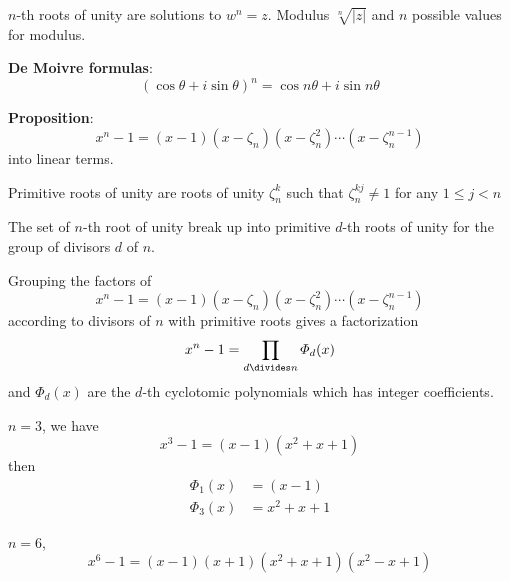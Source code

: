 \documentclass{report}
\begin{document}
$n$-th roots of unity are solutions to $w^{n} = z$. Modulus $\sqrt[n]{\lvert z \rvert}$ and $n$ possible values for modulus.

\textbf{De Moivre formulas}: 
    \begin{equation*}
        (\cos{\theta} + i \sin{\theta})^{n} = \cos{n \theta} + i \sin{n \theta}
    \end{equation*}

\textbf{Proposition}:
    \begin{equation*}
        x^{n} - 1 = (x - 1)(x - \zeta_{n})(x - \zeta_{n}^{2}) \cdots (x - \zeta_{n}^{n - 1})
    \end{equation*} 
into linear terms.

Primitive roots of unity are roots of unity $\zeta_{n}^{k}$ such that $\zeta_{n}^{kj} \neq 1$ for any $1 \leq j < n$

\begin{theorem}{}
    The set of $n$-th root of unity break up into primitive $d$-th roots of unity for the group of divisors $d$ of $n$.
\end{theorem}

\begin{theorem}{}
    Grouping the factors of 
        \begin{equation*}
            x^{n} - 1 = (x - 1)(x - \zeta_{n})(x - \zeta_{n}^{2}) \cdots (x - \zeta_{n}^{n - 1})
        \end{equation*}
    according to divisors of $n$ with primitive roots gives a factorization
        \begin{equation*}
            x^{n} - 1 = \prod_{d \divides n} \varPhi_{d}(x)
        \end{equation*}
    and $\varPhi_{d}(x)$ are the $d$-th cyclotomic polynomials which has integer coefficients.
\end{theorem}

\begin{examples}
    \begin{example}
        $n = 3$, we have 
            \begin{equation*}
                x^{3} - 1 = (x - 1)(x^{2} + x + 1)
            \end{equation*}
        then 
            \begin{align*}
                \varPhi_{1}(x) &= (x - 1)       \\
                \varPhi_{3}(x) &= x^{2} + x + 1   
            \end{align*}
    \end{example}
    \begin{example}
        $n = 6$, 
            \begin{equation*}
                x^{6} - 1 = (x - 1)(x + 1)(x^{2} + x + 1)(x^{2} - x + 1)
            \end{equation*}
    \end{example}
\end{examples}
\end{document}

